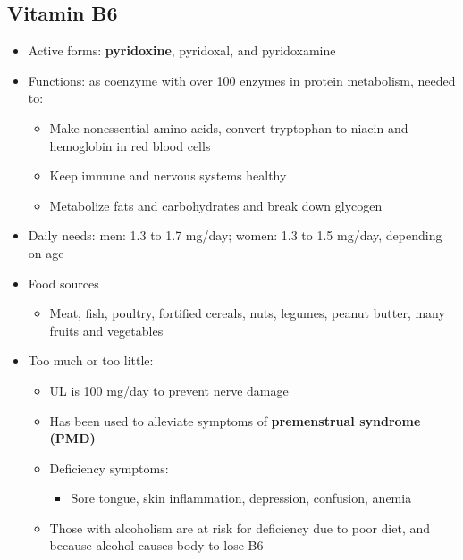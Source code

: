 \documentclass[12pt]{article}
\begin{document}
        \subsection{Vitamin B6}
            \begin{itemize}
                \item Active forms: \textbf{pyridoxine}, pyridoxal, and pyridoxamine
                \item Functions: as coenzyme with over 100 enzymes in protein metabolism, needed to:
                    \begin{itemize}
                        \item Make nonessential amino acids, convert tryptophan to niacin and hemoglobin in red blood cells
                        \item Keep immune and nervous systems healthy
                        \item Metabolize fats and carbohydrates and break down glycogen
                    \end{itemize}
                \item Daily needs: men: 1.3 to 1.7 mg/day; women: 1.3 to 1.5 mg/day, depending on age
                \item Food sources
                    \begin{itemize}
                        \item Meat, fish, poultry, fortified cereals, nuts, legumes, peanut butter, many fruits and vegetables
                    \end{itemize}
                \item Too much or too little:
                    \begin{itemize}
                        \item UL is 100 mg/day to prevent nerve damage
                        \item Has been used to alleviate symptoms of \textbf{premenstrual syndrome (PMD)}
                        \item Deficiency symptoms:
                            \begin{itemize}
                                \item Sore tongue, skin inflammation, depression, confusion, anemia
                            \end{itemize}
                        \item Those with alcoholism are at risk for deficiency due to poor diet, and because alcohol causes body to lose B6
                    \end{itemize}
            \end{itemize}
\end{document}
